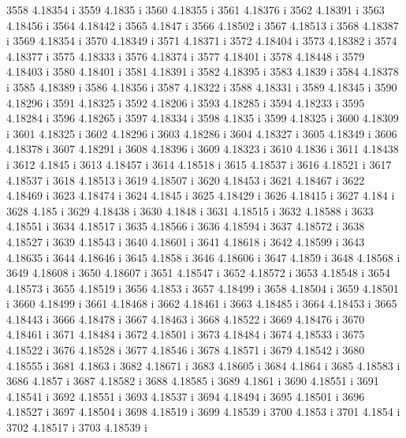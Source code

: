  3558  4.18354  i
 3559  4.1835  i
 3560  4.18355  i
 3561  4.18376  i
 3562  4.18391  i
 3563  4.18456  i
 3564  4.18442  i
 3565  4.1847  i
 3566  4.18502  i
 3567  4.18513  i
 3568  4.18387  i
 3569  4.18354  i
 3570  4.18349  i
 3571  4.18371  i
 3572  4.18404  i
 3573  4.18382  i
 3574  4.18377  i
 3575  4.18333  i
 3576  4.18374  i
 3577  4.18401  i
 3578  4.18448  i
 3579  4.18403  i
 3580  4.18401  i
 3581  4.18391  i
 3582  4.18395  i
 3583  4.1839  i
 3584  4.18378  i
 3585  4.18389  i
 3586  4.18356  i
 3587  4.18322  i
 3588  4.18331  i
 3589  4.18345  i
 3590  4.18296  i
 3591  4.18325  i
 3592  4.18206  i
 3593  4.18285  i
 3594  4.18233  i
 3595  4.18284  i
 3596  4.18265  i
 3597  4.18334  i
 3598  4.1835  i
 3599  4.18325  i
 3600  4.18309  i
 3601  4.18325  i
 3602  4.18296  i
 3603  4.18286  i
 3604  4.18327  i
 3605  4.18349  i
 3606  4.18378  i
 3607  4.18291  i
 3608  4.18396  i
 3609  4.18323  i
 3610  4.1836  i
 3611  4.18438  i
 3612  4.1845  i
 3613  4.18457  i
 3614  4.18518  i
 3615  4.18537  i
 3616  4.18521  i
 3617  4.18537  i
 3618  4.18513  i
 3619  4.18507  i
 3620  4.18453  i
 3621  4.18467  i
 3622  4.18469  i
 3623  4.18474  i
 3624  4.1845  i
 3625  4.18429  i
 3626  4.18415  i
 3627  4.184  i
 3628  4.185  i
 3629  4.18438  i
 3630  4.1848  i
 3631  4.18515  i
 3632  4.18588  i
 3633  4.18551  i
 3634  4.18517  i
 3635  4.18566  i
 3636  4.18594  i
 3637  4.18572  i
 3638  4.18527  i
 3639  4.18543  i
 3640  4.18601  i
 3641  4.18618  i
 3642  4.18599  i
 3643  4.18635  i
 3644  4.18646  i
 3645  4.1858  i
 3646  4.18606  i
 3647  4.1859  i
 3648  4.18568  i
 3649  4.18608  i
 3650  4.18607  i
 3651  4.18547  i
 3652  4.18572  i
 3653  4.18548  i
 3654  4.18573  i
 3655  4.18519  i
 3656  4.1853  i
 3657  4.18499  i
 3658  4.18504  i
 3659  4.18501  i
 3660  4.18499  i
 3661  4.18468  i
 3662  4.18461  i
 3663  4.18485  i
 3664  4.18453  i
 3665  4.18443  i
 3666  4.18478  i
 3667  4.18463  i
 3668  4.18522  i
 3669  4.18476  i
 3670  4.18461  i
 3671  4.18484  i
 3672  4.18501  i
 3673  4.18484  i
 3674  4.18533  i
 3675  4.18522  i
 3676  4.18528  i
 3677  4.18546  i
 3678  4.18571  i
 3679  4.18542  i
 3680  4.18555  i
 3681  4.1863  i
 3682  4.18671  i
 3683  4.18605  i
 3684  4.1864  i
 3685  4.18583  i
 3686  4.1857  i
 3687  4.18582  i
 3688  4.18585  i
 3689  4.1861  i
 3690  4.18551  i
 3691  4.18541  i
 3692  4.18551  i
 3693  4.18537  i
 3694  4.18494  i
 3695  4.18501  i
 3696  4.18527  i
 3697  4.18504  i
 3698  4.18519  i
 3699  4.18539  i
 3700  4.1853  i
 3701  4.1854  i
 3702  4.18517  i
 3703  4.18539  i
